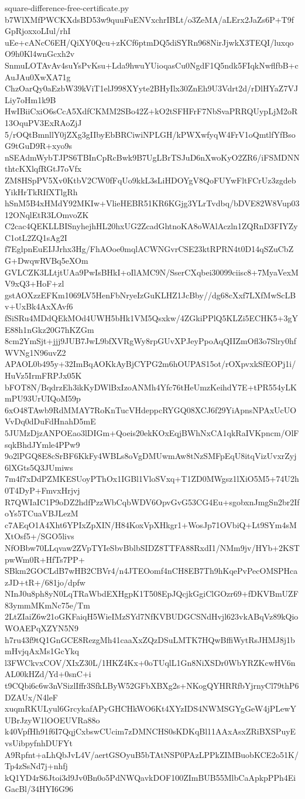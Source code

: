 \documentclass[11pt]{article}
\theoremstyle{definition}
\theoremstyle{remark}
\begin{document}
\begin{filecontents*}[overwrite]{square-difference-free-certificate.py}
b7WlXMfPWCKXdsBD53w9quuFuENVxchrIBLt/o3ZeMA/aLErx2JaZs6P+T9fGpRjoxxoLIul/rhI
uEe+cANcC6EH/QiXY0Qcu+zKCf6ptmDQ5diSYRn968NirJjwkX3TEQI/luxqoO9h0Kl4wnGcxh2v
SnmuLOTAvAv4suYsPvKsu+Lda9hwuYUioqasCu0NgdF1Q5ndk5FIqkNwflfbB+cAuJAu0XwXA71g
ChzOarQy0aEzbW39kViT1elJ998XYyte2BHyIlx30ZnEh9U3Vdrt2d/rDlHYaZ7VJLiy7oHm1k9B
HwIBiiCxiO6sCcA5XdfCKMM2SBo42Z+kO2tSFHFrF7NbSvaPRRQUypLjM2oR13OquPV3ExRAoZjJ
5/rOQtBmnllY0jZXg3gIIbyEbBRCiwiNPLGH/kPWXwfyqW4FrV1oQmtlfYfBsoG9tGuD9R+xyo9s
nSEAdmWybTJPS6TBInCpRcBwk9B7UgLBrTSJuD6nXwoKyO2ZR6/iFSMDNNthtcKXlqfRGtJ7oVfx
ZM8HSpPV5Xv0KtbV2CW0fFqUo9kkL3sLiHDOYgV8QoFUYwFltFCrUz3zgdebYikHrTkRIfXTlgRh
hSnM5B4xHMdY92MKIw+VlieHEBR51KR6KGjg3YLrTvdbq/bDVE82W8Vup0312ONqlEtR3LOmvoZK
C2cac4QEKLLBISnyhejhHL20hxUG2ZcadGhtnoKA8oWAlAczln1ZQRnD3FIYZyC1otL2ZQ1sAg2I
f7EglpnEuEIJJrhx3Hg/FhAOoe0mqlACWNGvrCSE23ktRPRN4t0D14qSZuCbZG+DwqwRVBq5eXOm
GVLCZK3LLtjtUAa9PwIsBHkI+oIlAMC9N/SserCXqbei30099ciisc8+7MyaVexMV9xQ3+HoF+zl
gstAOXzzEFKm1069LV5HenFbNryeIzGuKLHZ1JcBby//dg68cXxf7LXfMwScLBv+UxBk4AxXAvf6
fSiSRu4MDdQEkMOd4UWH5bHk1VM5Qsxkw/4ZGkiPPlQ5KLZi5ECHK5+3gYE88h1nGkz20G7hKZGm
8cm2YmSjt+jjj9JUB7JwL9bfXVRgWy8rpGUvXPJeyPpoAqQIIZmOfl3o7Slry0hfWVNg1N96uvZ2
APAOL0b495y+32ImBqAOKkAyBjCYPG2m6hOUPAS15ot/rOXpvxkSfEOPj1i/HuVz5IrmFRPJx05K
bFOT8N/BqdrzEh3ikKyDWlBxIzoANMh4Yfc76tHeUmzKeihdY7E+tPR554yLKmPU93UrUIQoM59p
6xO48TAwb9RdMMAY7RoKnTucVHdeppcRYGQ08XCJ6f29YiApnsNPAxUcUOVvDq0dDuFdHnahD5mE
5JUMzDjzANPOEao3lDIGm+Qoeis20ekKOxEqjBWhNxCA1qkRaIVKpncm/OlFsqkBhdJYmle4PPw9
9o2lPGQ8E8cSrBF6KkFy4WBLs8oVgDMUwmAw8tNzSMFpEqU8itqVizUvxrZyj6lXGts5Q3JUmiws
7m4f7xDdPZMKESUoyPThOx1IGBl1VloSVxq+T1ZD0MWgsz1lXiO5M5+74U2h0T4DyP+FmvxHrjvj
R7QWIaIC1P9oDZ2hdfPzzWbCqbWDV6OpvGvG53CG4Eu+sgobxnJmgSn2br2IfoYs5TCuaVBJLezM
c7AEqO1A4Xht6YPIxZpXIN/H84KoxVpXHkgr1+WosJp71OVbiQ+Lt9SYm4sMXtOsf5+/SGO5livs
NfOBbw70LLqvaw2ZVpTYIeSbvBblbSIDZ8TTFA88RxdI1/NMm9jv/HYb+2KSTpwWm0R+HfTs7PP+
SBkm2GOCLdB7wHB2CBVr4/n4JTEOomf4nCH8EB7Th9hKqePvPecOMSPHcazJD+tR+/681jo/dpfw
NInJ0u8ph8yN0LqTRaWbdEXHgpK1T508EpJQcjkGgiClGOzr69+fDKVBmUZF83ymmMKmNc75e/Tm
2LtZIaiZ6w21oGKFaiqH5WieIMzSYd7NfKVBUDGCSNdHvjl623vkABqVz89kQioWOAEPqXZYN5N9
h7ru43f9tQ1GnGCE8RezgMh41caaXxZQzDSuLMTK7HQwBffiWytRsJHMJ8j1bmHvjqAxMs1GcYkq
l3FWCkvxCOV/XIxZ30L/1HKZ4Kx+0oTUqlL1Gn8NiXSDr0WbYRZKcwHV6nAL00kHZd/Yd+0snC+i
t9CQbi6c6w3nVSizlIffr3SfkLByW52GFbXBXg2s+NKogQYHRRfbYjrnyCl79thP6DZAUx/N4leF
xuqmRKULyul6GrcykafAPyGHCHkWO6Kt4XYzIDS4NWMSGYgGeW4jPLewYUBrJzyW1lOOEUVRa88o
k40VpfHh91f6I7QqjCxbswCUcim7zDMNCHS0sKDKqBl11AAxAsxZRiBXSPuyEvsUibpyfnhDUFYt
A9Rpfnt+aLhQbJvL4V/aertGSOyuB5bTAtNSP0PAzLPPkZIMBuobKCE2o51K/Tp4zSsNd7j+nhfj
kQ1YD4rS6Jtoi3d9Jv0Bn0o5PdNWQavkDOF100ZImBUB55MlbCaApkpPPh4EiGacBl/34HYI6G96

\end{filecontents*}
\end{document}
